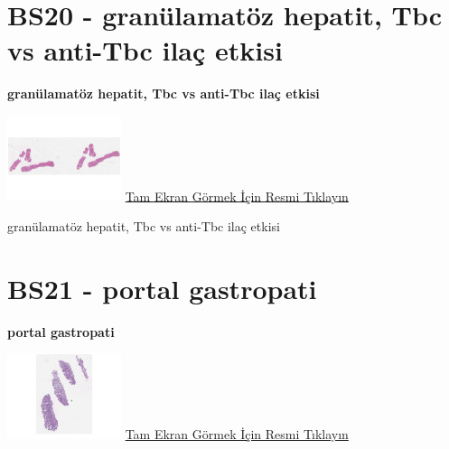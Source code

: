 \documentclass[
  letterpaper,
  DIV=11,
  numbers=noendperiod]{scrreprt}
\begin{document}
\hypertarget{sec-BS20}{%
\section{BS20 - granülamatöz hepatit, Tbc vs anti-Tbc ilaç
etkisi}\label{sec-BS20}}

\textbf{granülamatöz hepatit, Tbc vs anti-Tbc ilaç etkisi}

\href{https://images.patolojiatlasi.com/BS20/HE.html}{\includegraphics[width=0.25\textwidth,height=\textheight]{./screenshots/thumbnail_BS20-HE.png}}
\href{https://images.patolojiatlasi.com/BS20/HE.html}{Tam Ekran Görmek
İçin Resmi Tıklayın}

\begin{tcolorbox}[enhanced jigsaw, breakable, opacitybacktitle=0.6, arc=.35mm, colbacktitle=quarto-callout-tip-color!10!white, colback=white, toptitle=1mm, left=2mm, opacityback=0, colframe=quarto-callout-tip-color-frame, titlerule=0mm, rightrule=.15mm, bottomrule=.15mm, toprule=.15mm, bottomtitle=1mm, title=\textcolor{quarto-callout-tip-color}{\faLightbulb}\hspace{0.5em}{Tanı}, coltitle=black, leftrule=.75mm]

granülamatöz hepatit, Tbc vs anti-Tbc ilaç etkisi

\end{tcolorbox}

\hypertarget{sec-BS21}{%
\section{BS21 - portal gastropati}\label{sec-BS21}}

\textbf{portal gastropati}

\href{https://images.patolojiatlasi.com/BS21/HE.html}{\includegraphics[width=0.25\textwidth,height=\textheight]{./screenshots/thumbnail_BS21-HE.png}}
\href{https://images.patolojiatlasi.com/BS21/HE.html}{Tam Ekran Görmek
İçin Resmi Tıklayın}
\end{document}
